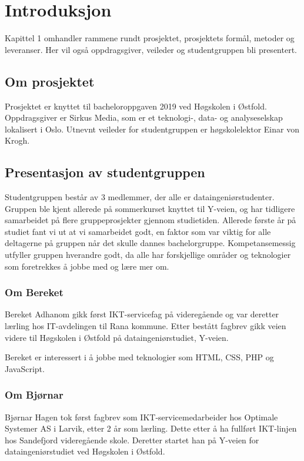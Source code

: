 \cleardoublepage
\chapter{Introduksjon}
\label{chap:intro}
Kapittel 1 omhandler rammene rundt prosjektet, prosjektets formål, metoder og leveranser. Her vil også oppdragsgiver, veileder og studentgruppen bli presentert. 
\section{Om prosjektet}
Prosjektet er knyttet til bacheloroppgaven 2019 ved Høgskolen i Østfold. Oppdragsgiver er Sirkus Media, som er et teknologi-, data- og analyseselskap lokalisert i Oslo. Utnevnt veileder for studentgruppen er høgskolelektor Einar von Krogh.

\section{Presentasjon av studentgruppen}

Studentgruppen består av 3 medlemmer, der alle er dataingeniørstudenter. Gruppen ble kjent allerede på sommerkurset knyttet til Y-veien, og har tidligere samarbeidet på flere gruppeprosjekter gjennom studietiden. Allerede første år på studiet fant vi ut at vi samarbeidet godt, en faktor som var viktig for alle deltagerne på gruppen når det skulle dannes bachelorgruppe. Kompetansemessig utfyller gruppen hverandre godt, da alle har forskjellige områder og teknologier som foretrekkes å jobbe med og lære mer om.  

\subsection{Om Bereket}
Bereket Adhanom gikk først IKT-servicefag på videregående og var deretter lærling hos IT-avdelingen til Rana kommune. Etter bestått fagbrev gikk veien videre til Høgskolen i Østfold på dataingeniørstudiet, Y-veien.

Bereket er interessert i å jobbe med teknologier som HTML, CSS, PHP og JavaScript.

\subsection{Om Bjørnar}
Bjørnar Hagen tok først fagbrev som IKT-servicemedarbeider hos Optimale Systemer AS i Larvik, etter 2 år som lærling. Dette etter å ha fullført IKT-linjen hos Sandefjord videregående skole. Deretter startet han på Y-veien for dataingeniørstudiet ved Høgskolen i Østfold.

